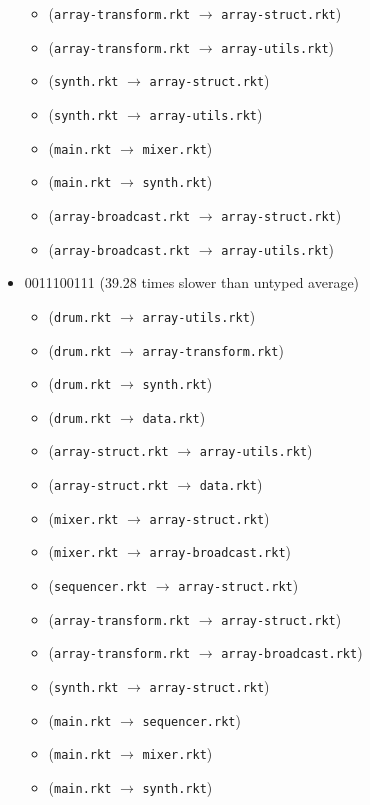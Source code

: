 \documentclass{article}
\newcommand{\mono}[1]{\texttt{#1}}
\begin{document}
\begin{itemize}
\begin{itemize}
  \item (\mono{array-transform.rkt} $\rightarrow$ \mono{array-struct.rkt})
  \item (\mono{array-transform.rkt} $\rightarrow$ \mono{array-utils.rkt})
  \item (\mono{synth.rkt} $\rightarrow$ \mono{array-struct.rkt})
  \item (\mono{synth.rkt} $\rightarrow$ \mono{array-utils.rkt})
  \item (\mono{main.rkt} $\rightarrow$ \mono{mixer.rkt})
  \item (\mono{main.rkt} $\rightarrow$ \mono{synth.rkt})
  \item (\mono{array-broadcast.rkt} $\rightarrow$ \mono{array-struct.rkt})
  \item (\mono{array-broadcast.rkt} $\rightarrow$ \mono{array-utils.rkt})
  \end{itemize}
\item 0011100111 (39.28 times slower than untyped average)
  \begin{itemize}
  \item (\mono{drum.rkt} $\rightarrow$ \mono{array-utils.rkt})
  \item (\mono{drum.rkt} $\rightarrow$ \mono{array-transform.rkt})
  \item (\mono{drum.rkt} $\rightarrow$ \mono{synth.rkt})
  \item (\mono{drum.rkt} $\rightarrow$ \mono{data.rkt})
  \item (\mono{array-struct.rkt} $\rightarrow$ \mono{array-utils.rkt})
  \item (\mono{array-struct.rkt} $\rightarrow$ \mono{data.rkt})
  \item (\mono{mixer.rkt} $\rightarrow$ \mono{array-struct.rkt})
  \item (\mono{mixer.rkt} $\rightarrow$ \mono{array-broadcast.rkt})
  \item (\mono{sequencer.rkt} $\rightarrow$ \mono{array-struct.rkt})
  \item (\mono{array-transform.rkt} $\rightarrow$ \mono{array-struct.rkt})
  \item (\mono{array-transform.rkt} $\rightarrow$ \mono{array-broadcast.rkt})
  \item (\mono{synth.rkt} $\rightarrow$ \mono{array-struct.rkt})
  \item (\mono{main.rkt} $\rightarrow$ \mono{sequencer.rkt})
  \item (\mono{main.rkt} $\rightarrow$ \mono{mixer.rkt})
  \item (\mono{main.rkt} $\rightarrow$ \mono{synth.rkt})

\end{itemize}
\end{itemize}
\end{document}
